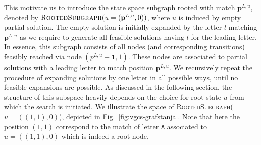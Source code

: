 \documentclass[runningheads]{llncs}
\begin{document}
This motivate us to introduce the state space subgraph rooted with match $\mathbf{p}^{L, u}$, denoted by $\textsc{RootedSubgraph}(u=(\mathbf{p}^{L, u}, 0))$, where $u$ is induced by empty partial solution. The empty solution  is initially expanded by the letter $l$ matching $\mathbf{p}^{L, u}$ as we require to generate all feasible solutions having $l$ for the leading letter.  
In essence,  this subgraph consists of all nodes (and corresponding transitions)  feasibly reached via node $(p^{L,u}+\textbf{1}, 1)$. These nodes are associated to partial solutions with a leading letter to match position $\mathbf{p}^{L, u}$. We recursively repeat the procedure of expanding solutions by one letter in all possible ways, until no feasible expansions are possible.  As discussed in the following section, the structure of this subspace heavily depends on the choice for root state $u$ from which the search is initiated. We illustrate  the space of \textsc{RootedSubgraph}($u=((1, 1), 0)$),  depicted in Fig.~\ref{fig:vgcs-grafstanja}. Note that here the position $(1,1)$ correspond to the match of letter \texttt{A} associated to $u=((1, 1), 0)$ which is indeed a root node. 
\end{document}
